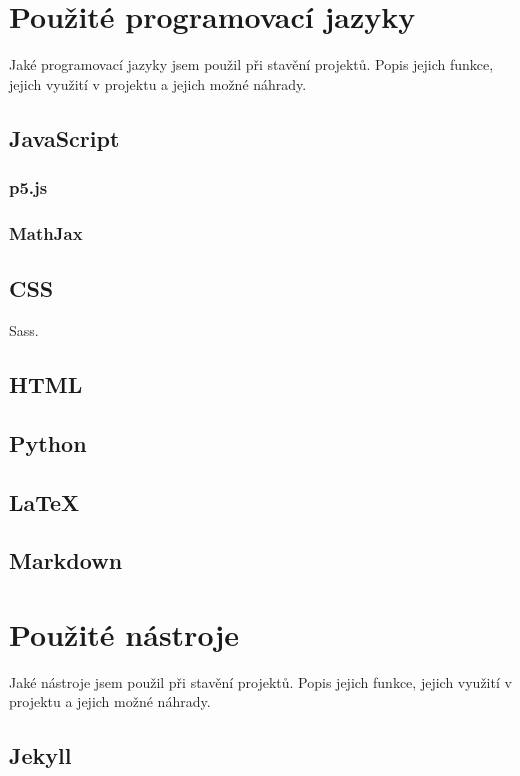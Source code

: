 \documentclass[a4paper, 12pt]{article}
\begin{document}
  \section{Použité programovací jazyky}
  Jaké programovací jazyky jsem použil při stavění projektů.
  Popis jejich funkce, jejich využití v projektu a jejich možné náhrady.

  \subsection{JavaScript}

  \subsubsection{p5.js}

  \subsubsection{MathJax}

  \subsection{CSS}
  Sass.

  \subsection{HTML}

  \subsection{Python}

  \subsection{\LaTeX{}}

  \subsection{Markdown}


  \section{Použité nástroje}
  Jaké nástroje jsem použil při stavění projektů.
  Popis jejich funkce, jejich využití v projektu a jejich možné náhrady.

  \subsection{Jekyll}
\end{document}
